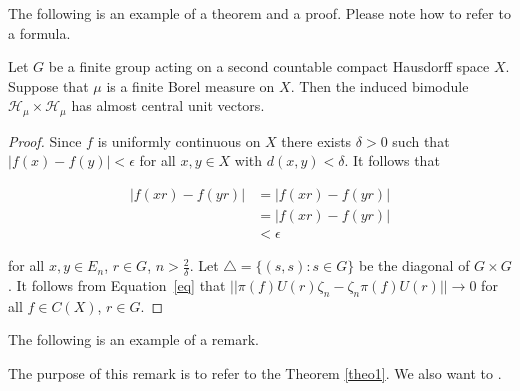 \documentclass{article}
\begin{document}

The following is an example of a theorem and a proof. Please note how to refer to a formula.


\begin{theorem}\label{theo1}
Let $G$ be a finite group acting on a second countable compact Hausdorff space $X$. Suppose that $\mu$ is a finite Borel measure on $X$. Then the induced bimodule $\mathcal{H}_\mu\times \mathcal{H}_\mu$ has almost central unit vectors.
\end{theorem}


\begin{proof}
Since $f$ is uniformly continuous on $X$ there exists $\delta>0$ such that $|f(x)-f(y)|<\epsilon$ for all $x,y\in X$ with $d(x,y)<\delta$. It follows that

\begin{align}\label{eq}
|f(xr)-f(yr)|&=|f(xr)-f(yr)|\nonumber\\
&=|f(xr)-f(yr)|\nonumber\\
&< \epsilon
\end{align}



for all $x,y\in E_n$, $r\in G$, $n>\frac{2}{\delta}$. Let $\bigtriangleup = \{(s, s): s\in G\}$ be the diagonal of $G\times G$. It follows from Equation~\eqref{eq} that  $||\pi(f)U(r)\zeta_n-\zeta_n\pi(f)U(r)||\rightarrow 0$ for all $f\in C(X)$, $r\in G$.
\end{proof}


The following is an example of a remark.


\begin{remark}
The purpose of this remark is to refer to the Theorem
\ref{theo1}. We also want to \cite{Brown, Connes}. 
\end{remark}

\end{document}
